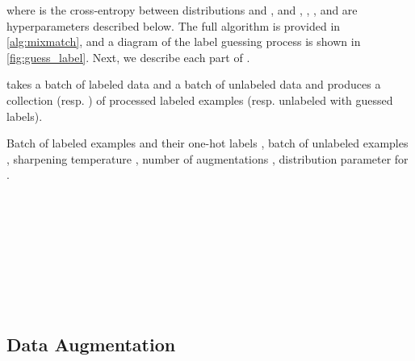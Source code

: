 \documentclass{article}
\begin{document}
where  is the cross-entropy between distributions  and , and , , , and  are hyperparameters described below.
The full  algorithm is provided in \cref{alg:mixmatch}, and a diagram of the label guessing process is shown in \cref{fig:guess_label}.
Next, we describe each part of .

\begin{algorithm*}[t]
        \caption{ takes a batch of labeled data  and a batch of unlabeled data  and produces a collection  (resp. ) of processed labeled examples (resp. unlabeled with guessed labels).}
   \label{alg:mixmatch}
\begin{algorithmic}[1]
   \footnotesize
    Batch of labeled examples and their one-hot labels , batch of unlabeled examples , sharpening temperature , number of augmentations ,  distribution parameter  for .
   \FOR{ \TO }
   \STATE  {} \label{line:augment_labeled} \\
   \FOR{ \TO }
   \STATE  {} \label{line:augment_unlabeled} \\
   \ENDFOR
   \STATE  {} \label{line:average_prediction} \\
   \STATE  {} \label{line:sharpen} \\
   \ENDFOR
   \STATE  {} \label{line:hat_x} \\
   \STATE  {} \label{line:hat_u} \\
   \STATE  {} \label{line:w} \\
   \STATE  {} \label{line:x_prime} \\
   \STATE  {} \label{line:u_prime} \\
   \RETURN 
\end{algorithmic}
\end{algorithm*}

\subsection{Data Augmentation}
\end{document}
